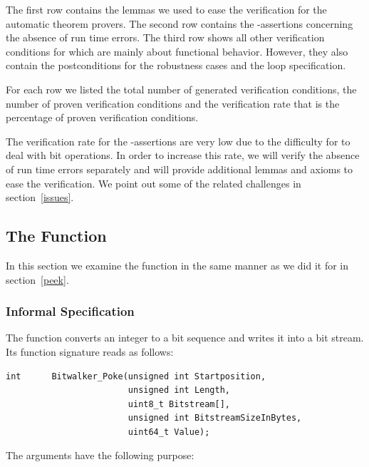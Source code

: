 The first row contains the lemmas we used to ease the verification for the automatic theorem provers.
The second row contains the -assertions 
concerning the absence of run time errors.
The third row shows all other verification conditions for \peek
which are mainly about functional behavior.
However, they also contain the postconditions for the robustness cases
and the loop specification.

For each row we listed the total number of generated verification conditions,
the number of proven verification conditions and the verification rate
that is the percentage of proven verification conditions. 

The verification rate for the -assertions are very low 
due to the difficulty for \framac to deal with bit operations.
In order to increase this rate, we will verify the absence
of run time errors separately and will provide additional lemmas and axioms
to ease the verification.
We point out some of the related challenges in section~\ref{issues}.



\clearpage

\subsection{The Function \poke}
\label{poke}


In this section we examine the function \poke
in the same manner as we did it for \peek in section~\ref{peek}.

\subsubsection{Informal Specification}
\label{informal-poke}

The function \poke converts an integer to a bit sequence and writes it
into a bit stream.
Its function signature reads as follows:
\begin{lstlisting}[style = acsl-block]
int      Bitwalker_Poke(unsigned int Startposition,
                        unsigned int Length,
                        uint8_t Bitstream[],
                        unsigned int BitstreamSizeInBytes,
                        uint64_t Value);
\end{lstlisting}


The arguments have the following purpose:

